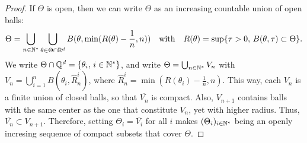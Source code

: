 \begin{proof}
    If $\Theta$ is open,
    then we can write $\Theta$ as an increasing countable union of open balls: %
        \begin{equation}
            \Theta = \bigcup_{n\in\mathbb{N}^\ast}\bigcup_{\theta\in\Theta\cap\mathbb{R}^d} B(\theta, \min(R(\theta)-\frac{1}{n},n) ) \quad \text{with} \quad R(\theta) = \sup\{\tau>0,\,B(\theta,\tau)\subset\Theta\}. 
        \end{equation}
    We write $\Theta\cap\mathbb{Q}^d=\{\theta_i,\,i\in\mathbb{N}^\ast\}$, and write $\Theta=\bigcup_{n\in\mathbb{N}^\ast}V_n$ with $V_n=\bigcup_{i=1}^nB(\theta_i,\hat R^i_n)$, where $\hat R^i_n =\min(R(\theta_i)-\frac{1}{n},n)$. This way, each $V_n$ is a finite union of closed balls, so that $\overline{V_n}$ is compact. Also, $V_{n+1}$ contains balls with the same center as the one that constitute $V_n$, yet with higher radius. Thus, $\overline{V_n}\subset V_{n+1}$. Therefore, setting $\Theta_i=\overline{V_i}$ for all $i$ makes $(\Theta_i)_{i\in\mathbb{N}^\ast}$ being an openly incresing sequence of compact subsets that cover $\Theta$.


\end{proof}
